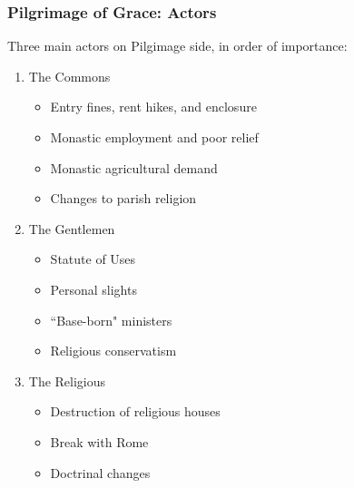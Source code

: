 \documentclass{beamer}
\begin{document}
    \begin{frame}
        \frametitle{Pilgrimage of Grace: Actors}
        Three main actors on Pilgimage side, in order of importance:
        \begin{enumerate}
            \item The Commons
            \begin{itemize}
                \item Entry fines, rent hikes, and enclosure
                \item Monastic employment and poor relief
                \item Monastic agricultural demand
                \item Changes to parish religion
            \end{itemize}
            \item The Gentlemen
            \begin{itemize}
                \item Statute of Uses
                \item Personal slights
                \item ``Base-born" ministers
                \item Religious conservatism
            \end{itemize}
            \item The Religious
            \begin{itemize}
                \item Destruction of religious houses
                \item Break with Rome
                \item Doctrinal changes
            \end{itemize}
        \end{enumerate}
    \end{frame}
    
\end{document}
